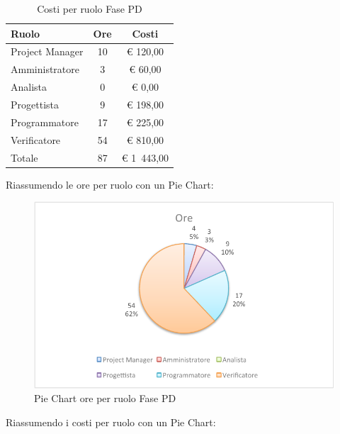 				\begin{table}[H]
					\begin{center}
						\begin{tabular}{| l | c | c |}
							\hline
							Ruolo 				& Ore 		& Costi  \\ \hline
							
							Project Manager		& 10 		& \euro{} 120,00 	\\
							Amministratore 		& 3 		& \euro{} 60,00 	\\
							Analista	 		& 0			& \euro{} 0,00	\\
							Progettista 		& 9 		& \euro{} 198,00  	\\
							Programmatore		& 17 		& \euro{} 225,00 	\\
							Verificatore		& 54 		& \euro{} 810,00 	\\ \hline \hline
							
							Totale	 			& 87 		& \euro{} 1~443,00 	\\ \hline
						\end{tabular}
					\end{center}
					\caption{Costi per ruolo Fase PD}
				\end{table}
				Riassumendo le ore per ruolo con un Pie Chart:
				\begin{figure}[H]\centering
					\includegraphics[width=\textwidth]{PianoDiProgetto/Pics/ChartTotOreFasePD.pdf}
					\caption{Pie Chart ore per ruolo Fase PD}
				\end{figure}
				Riassumendo i costi per ruolo con un Pie Chart:
